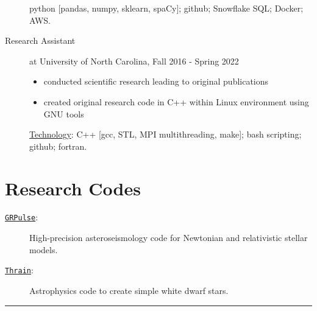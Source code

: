 \documentclass[11pt, letter]{article}
\begin{document}
\begin{minipage}{\textwidth}
\begin{description}
		python [pandas, numpy, sklearn, spaCy]; github; Snowflake SQL; Docker; AWS.
	\item[Research Assistant] at University of North Carolina, Fall 2016 - Spring 2022
		\vspace{-0.5\baselineskip}
		\begin{itemize}
			\item conducted scientific research leading to original publications
			\item created original research code in C++ within Linux environment using GNU tools
		\end{itemize}
		\vspace{-0.5\baselineskip}
		\underline{Technology}: 
		C++ [gcc, STL, MPI multithreading, make]; bash scripting; github; fortran.
		\vspace{-0.5\baselineskip}
	\end{description}
\end{minipage}

\section*{Research Codes}
\begin{minipage}{\textwidth}
	\begin{description}
		\item[\href{https://github.com/rboston628/grpulse}{\tt GRPulse}:] High-precision asteroseismology code for Newtonian and relativistic stellar models.			
		\item[\href{https://github.com/rboston628/thrain}{\tt Thrain}:] Astrophysics code to create simple white dwarf stars.
	\end{description}
\hrule
\end{minipage}
\end{document}
